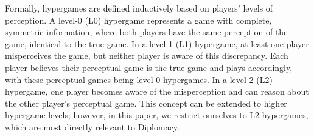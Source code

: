 





Formally, hypergames are defined inductively based on players' levels of perception. A level-0 (L0) hypergame represents a game with complete, symmetric information, where both players have the same perception of the game, identical to the true game. In a level-1 (L1) hypergame, at least one player misperceives the game, but neither player is aware of this discrepancy. Each player believes their perceptual game is the true game and plays accordingly, with these perceptual games being level-0 hypergames. In a level-2 (L2) hypergame, one player becomes aware of the misperception and can reason about the other player's perceptual game. This concept can be extended to higher hypergame levels; however, in this paper, we restrict ourselves to L2-hypergames, which are most directly relevant to Diplomacy.



